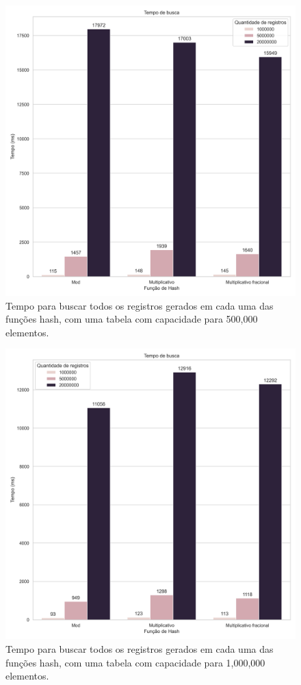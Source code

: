 \documentclass[12pt]{article}
\begin{document}
\newpage
\begin{figure}[ht]
\centering
\includegraphics[width=\textwidth,height=\textheight,keepaspectratio]{figures/lookup_runtime_500000.png}
\caption{Tempo para buscar todos os registros gerados em cada uma das funções hash, com uma tabela com capacidade para 500,000 elementos.}
\end{figure}

\newpage
\begin{figure}[ht]
\centering
\includegraphics[width=\textwidth,height=\textheight,keepaspectratio]{figures/lookup_runtime_1000000.png}
\caption{Tempo para buscar todos os registros gerados em cada uma das funções hash, com uma tabela com capacidade para 1,000,000 elementos.}
\end{figure}
\end{document}
